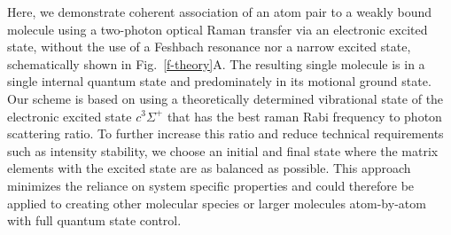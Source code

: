 \documentclass[aps,prl,twocolumn,groupedaddress]{revtex4-1}
\begin{document}
Here, we demonstrate coherent association of an atom pair to a weakly bound molecule using a two-photon optical Raman transfer via an electronic excited state, without the use of a Feshbach resonance nor a narrow excited state, schematically shown in Fig.~\ref{f-theory}A. The resulting single molecule is in a single internal quantum state and predominately in its motional ground state.  Our scheme is based on using a theoretically determined vibrational state of the electronic excited state $c^3\Sigma^+$ that has the best raman Rabi frequency to photon scattering ratio. To further increase this ratio and reduce technical requirements such as intensity stability, we choose an initial and final state where the matrix elements with the excited state are as balanced as possible. This approach minimizes the reliance on system specific properties and could therefore be applied to creating other molecular species or larger molecules atom-by-atom with full quantum state control.





\end{document}

